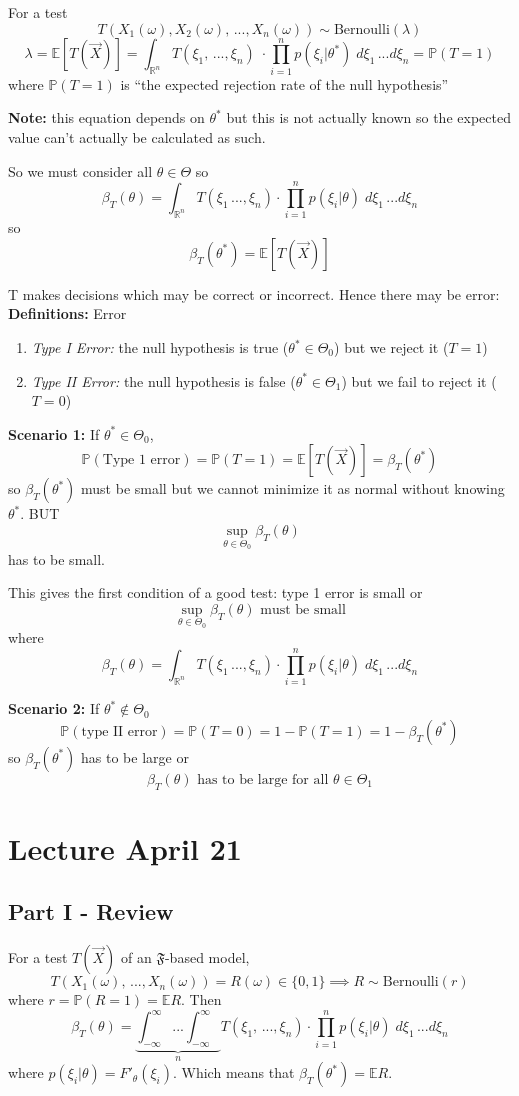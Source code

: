 \documentclass[12pt]{article}
\renewcommand{\P}{\mathbb{P}}
\newcommand{\R}{\mathbb{R}}
\newcommand{\E}{\mathbb{E}}
\begin{document}
For a test 
\[T(X_1(\omega), X_2(\omega), \, ..., X_n(\omega)) \sim \text{Bernoulli}(\lambda)\]
\[\lambda = \E[T(\vec{X})] = \int_{\R^n} T(\xi_1, \, ..., \xi_n) \; \cdot \prod_{i=1}^n p(\xi_i | \theta^*) \; d\xi_1\, ... d\xi_n = \P(T = 1)\]
where $\P(T = 1)$ is ``the expected rejection rate of the null hypothesis''

\textbf{Note:} this equation depends on $\theta^*$ but this is not actually known so the expected value can't actually be calculated as such. 

So we must consider all $\theta \in \Theta$ so 
\[ \beta_T(\theta) = \int_{\R^n}T(\xi_1\, ...,\xi_n) \cdot \prod_{i=1}^n p(\xi_i | \theta) \; d\xi_1\, ... d\xi_n\] 
so 
\[\beta_T(\theta^*) = \E[T(\vec{X})]\]


T makes decisions which may be correct or incorrect. Hence there may be error:
\textbf{Definitions:} Error
\begin{enumerate}
    \item \emph{Type I Error:} the null hypothesis is true ($\theta^* \in \Theta_0$) but we reject it ($T = 1$)
    \item \emph{Type II Error:} the null hypothesis is false ($\theta^* \in \Theta_1$) but we fail to reject it ($T = 0$)
\end{enumerate}

\textbf{Scenario 1:} If $\theta^* \in \Theta_0$, 
\[\P(\text{Type 1 error}) = \P(T= 1) = \E[T(\vec{X})] = \beta_T(\theta^*)\]
so $\beta_T(\theta^*)$ must be small but we cannot minimize it as normal without knowing $\theta^*$. BUT 
\[\sup_{\theta \in \Theta_0} \beta_T(\theta)\]
has to be small. 

This gives the first condition of a good test: type 1 error is small or 
\[\boxed{\sup_{\theta \in \Theta_0} \beta_T(\theta) \text{  must be small}}\]
where
\[ \beta_T(\theta) = \int_{\R^n}T(\xi_1\, ...,\xi_n) \cdot \prod_{i=1}^n p(\xi_i | \theta) \; d\xi_1\, ... d\xi_n\] 

\textbf{Scenario 2:} If $\theta^* \notin \Theta_0$ 
\[\P(\text{type II error}) = \P(T = 0) = 1 - \P(T = 1) = 1 - \beta_T(\theta^*)\]
so $\beta_T(\theta^*)$ has to be large or
\[\boxed{\beta_T(\theta) \text{  has to be large for all  } \theta \in \Theta_1}\]

\section*{Lecture April 21}
\subsection*{Part I - Review}
For a test $T(\vec{X})$ of an $\mathfrak{F}$-based model, 
\[T(X_1(\omega), \,..., X_n(\omega)) = R(\omega) \in \{0, 1\}\implies R \sim \text{Bernoulli}(r)\]
where $r = \P(R=1) = \E R$.
Then 
\[\beta_T(\theta) = \underbrace{\int_{-\infty}^{\infty} ... \int_{-\infty}^{\infty} }_{n} T(\xi_1,\, ..., \xi_n) \cdot \prod_{i=1}^n p(\xi_i | \theta) \; d\xi_1\, ... d\xi_n\] 
where $p(\xi_i | \theta) = F'_\theta (\xi_i)$.
Which means that $\beta_T(\theta^*) = \E R$. 
\end{document}
